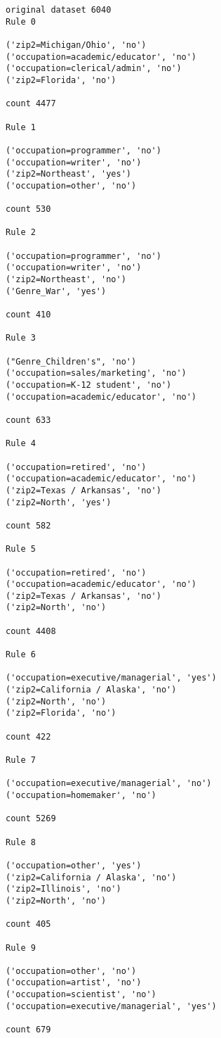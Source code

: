 \documentclass[12pt,fleqn]{article}\usepackage{../common}
\begin{document}
\begin{verbatim}
original dataset 6040
Rule 0

('zip2=Michigan/Ohio', 'no')
('occupation=academic/educator', 'no')
('occupation=clerical/admin', 'no')
('zip2=Florida', 'no')

count 4477

Rule 1

('occupation=programmer', 'no')
('occupation=writer', 'no')
('zip2=Northeast', 'yes')
('occupation=other', 'no')

count 530

Rule 2

('occupation=programmer', 'no')
('occupation=writer', 'no')
('zip2=Northeast', 'no')
('Genre_War', 'yes')

count 410

Rule 3

("Genre_Children's", 'no')
('occupation=sales/marketing', 'no')
('occupation=K-12 student', 'no')
('occupation=academic/educator', 'no')

count 633

Rule 4

('occupation=retired', 'no')
('occupation=academic/educator', 'no')
('zip2=Texas / Arkansas', 'no')
('zip2=North', 'yes')

count 582

Rule 5

('occupation=retired', 'no')
('occupation=academic/educator', 'no')
('zip2=Texas / Arkansas', 'no')
('zip2=North', 'no')

count 4408

Rule 6

('occupation=executive/managerial', 'yes')
('zip2=California / Alaska', 'no')
('zip2=North', 'no')
('zip2=Florida', 'no')

count 422

Rule 7

('occupation=executive/managerial', 'no')
('occupation=homemaker', 'no')

count 5269

Rule 8

('occupation=other', 'yes')
('zip2=California / Alaska', 'no')
('zip2=Illinois', 'no')
('zip2=North', 'no')

count 405

Rule 9

('occupation=other', 'no')
('occupation=artist', 'no')
('occupation=scientist', 'no')
('occupation=executive/managerial', 'yes')

count 679


\end{verbatim}
\end{document}
